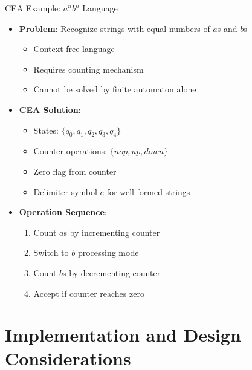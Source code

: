 \documentclass[aspectratio=169,11pt]{beamer}
\newcommand{\concept}[1]{\textbf{\color{accentcolor}#1}}
\begin{document}
\begin{frame}{CEA Example: $a^nb^n$ Language}
\begin{itemize}
\item \concept{Problem}: Recognize strings with equal numbers of $a$s and $b$s
\begin{itemize}
\item Context-free language
\item Requires counting mechanism
\item Cannot be solved by finite automaton alone
\end{itemize}
\vspace{0.5cm}
\item \concept{CEA Solution}:
\begin{itemize}
\item States: $\{q_0, q_1, q_2, q_3, q_4\}$
\item Counter operations: $\{nop, up, down\}$
\item Zero flag from counter
\item Delimiter symbol $e$ for well-formed strings
\end{itemize}
\vspace{0.3cm}
\item \concept{Operation Sequence}:
\begin{enumerate}
\item Count $a$s by incrementing counter
\item Switch to $b$ processing mode
\item Count $b$s by decrementing counter
\item Accept if counter reaches zero
\end{enumerate}
\end{itemize}
\end{frame}

\section{Implementation and Design Considerations}
\end{document}
